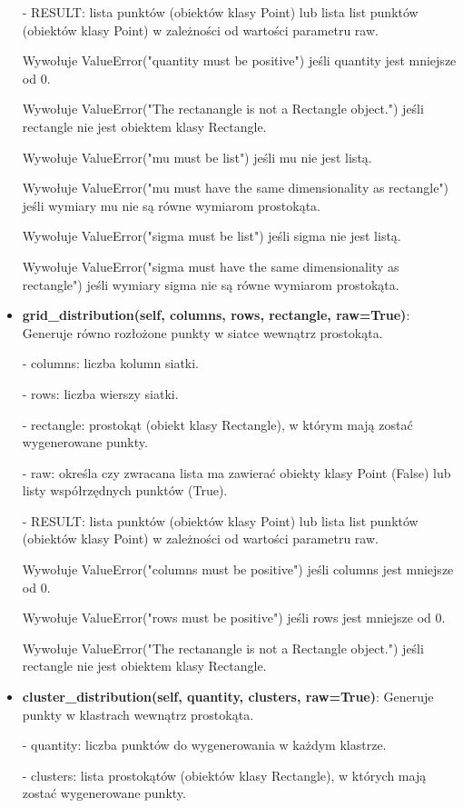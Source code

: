 \documentclass{lab}
\begin{document}
\begin{itemize}
  - RESULT: lista punktów (obiektów klasy Point) lub lista list punktów (obiektów klasy Point) w zależności od wartości parametru raw.

  Wywołuje ValueError("quantity must be positive") jeśli quantity jest mniejsze od 0.

  Wywołuje ValueError("The rectanangle is not a Rectangle object.") jeśli rectangle nie jest obiektem klasy Rectangle.

  Wywołuje ValueError("mu must be list") jeśli mu nie jest listą.

  Wywołuje ValueError("mu must have the same dimensionality as rectangle") jeśli wymiary mu nie są równe wymiarom prostokąta.

  Wywołuje ValueError("sigma must be list") jeśli sigma nie jest listą.

  Wywołuje ValueError("sigma must have the same dimensionality as rectangle") jeśli wymiary sigma nie są równe wymiarom prostokąta.

  \item \textbf{grid\_distribution(self, columns, rows, rectangle, raw=True)}:
  Generuje równo rozłożone punkty w siatce wewnątrz prostokąta.

  - columns: liczba kolumn siatki.

  - rows: liczba wierszy siatki.

  - rectangle: prostokąt (obiekt klasy Rectangle), w którym mają zostać wygenerowane punkty.

  - raw: określa czy zwracana lista ma zawierać obiekty klasy Point (False) lub listy współrzędnych punktów (True).

  - RESULT: lista punktów (obiektów klasy Point) lub lista list punktów (obiektów klasy Point) w zależności od wartości parametru raw.

  Wywołuje ValueError("columns must be positive") jeśli columns jest mniejsze od 0.

  Wywołuje ValueError("rows must be positive") jeśli rows jest mniejsze od 0.

  Wywołuje ValueError("The rectanangle is not a Rectangle object.") jeśli rectangle nie jest obiektem klasy Rectangle.

  \item \textbf{cluster\_distribution(self, quantity, clusters, raw=True)}:
  Generuje punkty w klastrach wewnątrz prostokąta.

  - quantity: liczba punktów do wygenerowania w każdym klastrze.

  - clusters: lista prostokątów (obiektów klasy Rectangle), w których mają zostać wygenerowane punkty.


\end{itemize}
\end{document}
